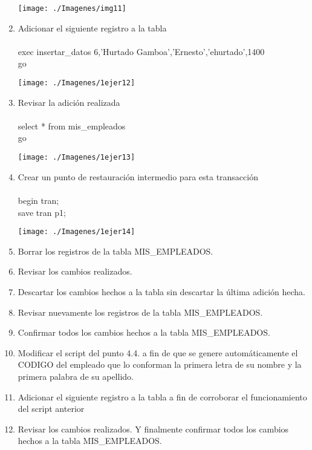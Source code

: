 \begin{enumerate}[1.]
	\begin{center}
	\texttt{[image: ./Imagenes/img11]} 
	\end{center}
	\item Adicionar el siguiente registro a la tabla
           \\
	\\exec insertar\_datos 6,'Hurtado Gamboa','Ernesto','ehurtado',1400
	\\ go

	\begin{center}
	\texttt{[image: ./Imagenes/1ejer12]} 
	\end{center}

	\item Revisar la adición realizada
          \\
	\\select * from mis\_empleados
	\\ go

	\begin{center}
	\texttt{[image: ./Imagenes/1ejer13]} 
	\end{center}

	\item Crear un punto de restauración intermedio para esta transacción
          \\
	\\begin tran;
           \\save tran p1;
	\begin{center}
	\texttt{[image: ./Imagenes/1ejer14]} 
	\end{center} 

	\item Borrar los registros de la tabla MIS\_EMPLEADOS.
	\item Revisar los cambios realizados.
	\item Descartar los cambios hechos a la tabla sin descartar la última adición hecha.
	\item Revisar nuevamente los registros de la tabla MIS\_EMPLEADOS.
	\item Confirmar todos los cambios hechos a la tabla MIS\_EMPLEADOS.
	\item Modificar el script del punto 4.4. a fin de que se genere automáticamente el CODIGO del empleado que lo conforman la primera letra de su nombre y la primera palabra de su apellido.
	\item Adicionar el siguiente registro a la tabla a fin de corroborar el funcionamiento del script anterior
	\item Revisar los cambios realizados. Y finalmente confirmar todos los cambios hechos a la tabla MIS\_EMPLEADOS.

\end{enumerate} 

